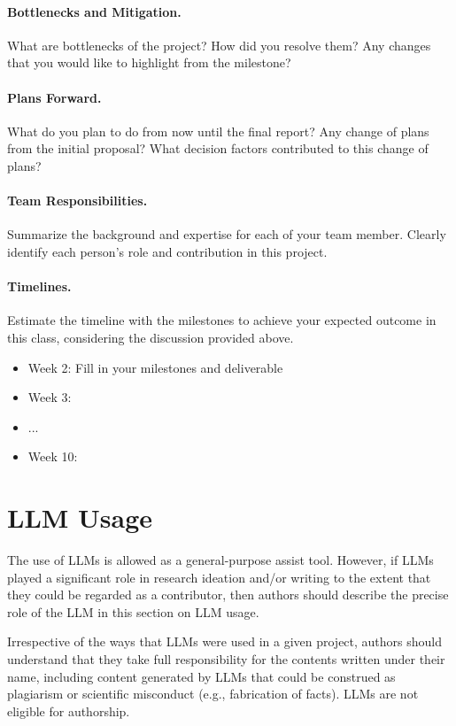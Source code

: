 \documentclass{article}
\begin{document}
\paragraph{Bottlenecks and Mitigation.}
What are bottlenecks of the project? How did you resolve them?  Any changes that you would like to highlight from the milestone?



\paragraph{Plans Forward.}
What do you plan to do from now until the final report? Any change of plans from the initial proposal? What decision factors contributed to this change of plans?



\paragraph{Team Responsibilities.}
Summarize the background and expertise for each of your team member. Clearly identify each person's role and contribution in this project.

\paragraph{Timelines.}
Estimate the timeline with the milestones to achieve your expected outcome in this class, considering the discussion provided above.
\begin{itemize}
    \item Week 2: Fill in your milestones and deliverable
    \item Week 3:
    \item ...
    \item Week 10:
\end{itemize}


\section*{LLM Usage}
The use of LLMs is allowed as a general-purpose assist tool. However,  if LLMs played a significant role in research ideation and/or writing to the extent that they could be regarded as a contributor, then authors should describe the precise role of the LLM in this section on LLM usage. 

Irrespective of the ways that LLMs were used in a given project, authors should understand that they take full responsibility for the contents written under their name, including content generated by LLMs that could be construed as plagiarism or scientific misconduct (e.g., fabrication of facts).  LLMs are not eligible for authorship.
\end{document}
